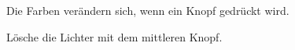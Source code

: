 \begin{figure}[htb]
\begin{center}
\caption{Die Farben verändern sich, wenn ein Knopf gedrückt wird.}\label{fig.colors}
\end{center}
\end{figure}

\begin{figure}[htb]
\begin{center}
\caption{Lösche die Lichter mit dem mittleren Knopf.}\label{fig.colors-off}
\end{center}
\end{figure}
